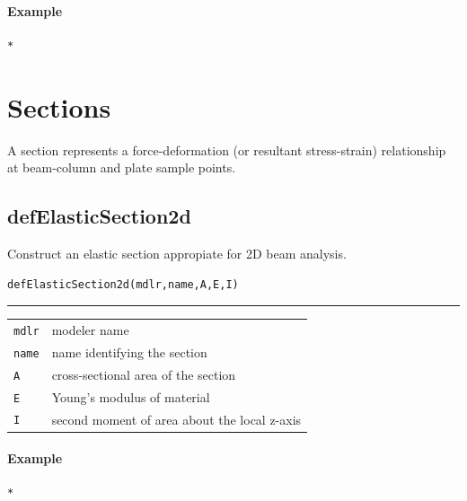 \paragraph{Example}
\begin{verbatim}
*
\end{verbatim}
\section{Sections}
A section represents a force-deformation (or resultant stress-strain) relationship at beam-column and plate sample points. 
\subsection{defElasticSection2d}
\noindent Construct an elastic section appropiate for 2D beam analysis.
\begin{verbatim}
defElasticSection2d(mdlr,name,A,E,I)
\end{verbatim}
\vspace{-10pt}
{\color{grayLines} \rule{\linewidth}{0.25pt}}
\begin{center}
\begin{tabular}{lp{10cm}}
{\tt mdlr} & modeler name \\
{\tt name} & name identifying the section \\
{\tt A} &  cross-sectional area of the section \\
{\tt E} &  Young's modulus of material \\
{\tt I} &  second moment of area about the local z-axis\\
\end{tabular}
\end{center}
\paragraph{Example}
\begin{verbatim}
*
\end{verbatim}


